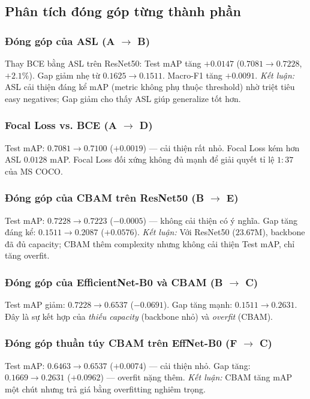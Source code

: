 \documentclass[conference]{IEEEtran}
\begin{document}
\subsection{Phân tích đóng góp từng thành phần}

\subsubsection{Đóng góp của ASL (A $\to$ B)}
Thay BCE bằng ASL trên ResNet50:
Test mAP tăng $+0.0147$ ($0.7081 \to 0.7228$, $+2.1\%$).
Gap giảm nhẹ từ $0.1625 \to 0.1511$.
Macro-F1 tăng $+0.0091$.
\textit{Kết luận:} ASL cải thiện đáng kể mAP (metric không phụ thuộc threshold)
nhờ triệt tiêu easy negatives; Gap giảm cho thấy ASL giúp generalize tốt hơn.

\subsubsection{Focal Loss vs. BCE (A $\to$ D)}
Test mAP: $0.7081 \to 0.7100$ ($+0.0019$) --- cải thiện rất nhỏ.
Focal Loss kém hơn ASL $0.0128$ mAP. Focal Loss đối xứng không đủ mạnh
để giải quyết tỉ lệ $1{:}37$ của MS COCO.

\subsubsection{Đóng góp của CBAM trên ResNet50 (B $\to$ E)}
Test mAP: $0.7228 \to 0.7223$ ($-0.0005$) --- không cải thiện có ý nghĩa.
Gap tăng đáng kể: $0.1511 \to 0.2087$ ($+0.0576$).
\textit{Kết luận:} Với ResNet50 ($23.67\text{M}$), backbone đã đủ capacity;
CBAM thêm complexity nhưng không cải thiện Test mAP, chỉ tăng overfit.

\subsubsection{Đóng góp của EfficientNet-B0 và CBAM (B $\to$ C)}
Test mAP giảm: $0.7228 \to 0.6537$ ($-0.0691$).
Gap tăng mạnh: $0.1511 \to 0.2631$.
Đây là sự kết hợp của \textit{thiếu capacity} (backbone nhỏ) và \textit{overfit} (CBAM).

\subsubsection{Đóng góp thuần túy CBAM trên EffNet-B0 (F $\to$ C)}
Test mAP: $0.6463 \to 0.6537$ ($+0.0074$) --- cải thiện nhỏ.
Gap tăng: $0.1669 \to 0.2631$ ($+0.0962$) --- overfit nặng thêm.
\textit{Kết luận:} CBAM tăng mAP một chút nhưng trả giá bằng overfitting nghiêm trọng.
\end{document}

